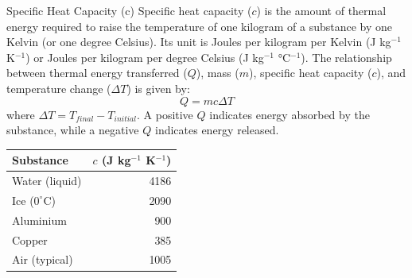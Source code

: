 \begin{keyconcept}{Specific Heat Capacity (c)}
Specific heat capacity (\(c\)) is the amount of thermal energy required to raise the temperature of one kilogram of a substance by one Kelvin (or one degree Celsius). Its unit is Joules per kilogram per Kelvin (J kg\(^{-1}\) K\(^{-1}\)) or Joules per kilogram per degree Celsius (J kg\(^{-1}\) °C\(^{-1}\)). The relationship between thermal energy transferred (\(Q\)), mass (\(m\)), specific heat capacity (\(c\)), and temperature change (\(\Delta T\)) is given by:
\begin{equation}
Q = mc\Delta T
\label{eq:specific_heat}
\end{equation}
where \(\Delta T = T_{final} - T_{initial}\). A positive \(Q\) indicates energy absorbed by the substance, while a negative \(Q\) indicates energy released.
\end{keyconcept}



\begin{marginfigure}[-10pt]
\centering
\small %
\begin{tabular}{lr}
\toprule
Substance & \(c\) (J kg\(^{-1}\) K\(^{-1}\)) \\
\midrule
Water (liquid) & 4186 \\
Ice (\(0^\circ\)C) & 2090 \\
Aluminium & 900 \\
Copper & 385 \\
Air (typical) & 1005 \\
\bottomrule
\end{tabular}
\caption{Approximate specific heat capacities of common substances. Note water's high value.}
\label{tab:specific_heat}
\end{marginfigure}

